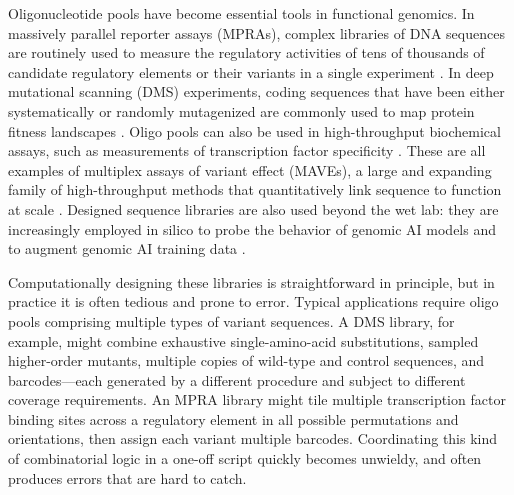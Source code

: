 \documentclass[twoside]{kinneylab_preprintstyle}
\begin{document}
Oligonucleotide pools have become essential tools in functional genomics. In massively parallel reporter assays (MPRAs), complex libraries of DNA sequences are routinely used to measure the regulatory activities of tens of thousands of candidate regulatory elements or their variants in a single experiment \citep{Patwardhan2009cw, Kinney2010tn, Melnikov2012dw, Kwasnieski2012hu, Sharon2012io, Mogno2013cf, Levo2014hl, Inoue2015cs, Vvedenskaya2015ih, Urtecho2018hu, Klein2020, Romero2023, LaFleur2024aa}. In deep mutational scanning (DMS) experiments, coding sequences that have been either systematically or randomly mutagenized are commonly used to map protein fitness landscapes \citep{Fowler2010gt, Hietpas2011bp, Fowler2014gq, Olson2014iq, Adams2016dka, Findlay2018kd, Starr2020aa}. Oligo pools can also be used in high-throughput biochemical assays, such as measurements of transcription factor specificity \citep{Berger2006wp, Maerkl2007tv, Noyes2008vr, Gordan2013, Le2018cr, Shen2018ip, Khetan2025_paditseq}. These are all examples of multiplex assays of variant effect (MAVEs), a large and expanding family of high-throughput methods that quantitatively link sequence to function at scale \citep{Kinney2019jc, Starita2017ec, Weile2018gm}. Designed sequence libraries are also used beyond the wet lab: they are increasingly employed in silico to probe the behavior of genomic AI models \citep{Avsec2021bpnet, Toneyan2024creme, Seitz2024squid, Seitz2025, Nagai2026review} and to augment genomic AI training data \citep{Lee2023}.

Computationally designing these libraries is straightforward in principle, but in practice it is often tedious and prone to error. Typical applications require oligo pools comprising multiple types of variant sequences. A DMS library, for example, might combine exhaustive single-amino-acid substitutions, sampled higher-order mutants, multiple copies of wild-type and control sequences, and barcodes---each generated by a different procedure and subject to different coverage requirements. An MPRA library might tile multiple transcription factor binding sites across a regulatory element in all possible permutations and orientations, then assign each variant multiple barcodes. Coordinating this kind of combinatorial logic in a one-off script quickly becomes unwieldy, and often produces errors that are hard to catch.
\end{document}
